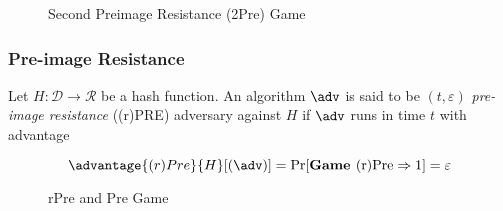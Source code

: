 \documentclass[11pt,a4paper]{article}
\begin{document}
\begin{figure}[H]
\begin{pchstack}[ center , boxed,  space=0.5cm]
\end{pchstack}
\caption{Second Preimage Resistance (2Pre) Game}
\label{fig:2pre-game}
\end{figure}

\subsubsection{Pre-image Resistance}
Let $H: \mathcal{D} \rightarrow \mathcal{R}$ be a hash function. An algorithm $\adv$ is said to be $(t,\varepsilon)$ \textit{pre-image resistance} ((r)PRE) adversary against $H$ if $\adv$ runs in time $t$ with advantage  

$$
\advantage{(r)Pre}{H}[(\adv)] = \Pr[\textbf{Game } \text{(r)Pre} \Rightarrow 1] = \varepsilon
$$ 

\begin{figure}[H]
\begin{pchstack}[ center , boxed, space=0.5cm]


\end{pchstack}
\caption{rPre and Pre Game}
\label{fig:rpre-game}
\end{figure}
\end{document}
